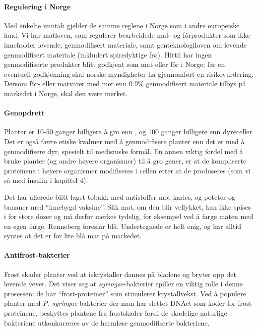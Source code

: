 \paragraph{Regulering i Norge} Med enkelte unntak gjelder de samme reglene i Norge som i andre europeiske land. Vi har matloven, som regulerer bearbeidede mat- og fôrprodukter som ikke inneholder levende, genmodifisert materiale, samt genteknologiloven om levende genmodifisert materiale (inkludert spiredyktige frø). Hittil har ingen genmodifiserte produkter blitt godkjent som mat eller fôr i Norge; før en eventuell godkjenning skal norske myndigheter ha gjennomført en risikovurdering. Dersom fôr- eller matvarer med mer enn 0.9\% genmodifisert materiale tilbys på markedet i Norge, skal den være merket.

\paragraph{Genopdrett} Planter er 10-50 ganger billigere å gro enn , og 100 ganger billigere enn dyreceller. Det er også færre etiske kvalmer med å genmodifisere planter enn det er med å genmodifisere dyr, spesielt til medisinske formål. En annen viktig fordel med å bruke planter (og andre høyere organismer) til å gro gener, er at de kompliserte proteinene i høyere organismer modifiseres i cellen etter at de produseres (som vi så med insulin i kapittel 4).

Det har allerede blitt laget tobakk med antistoffer mot karies, og poteter og bananer med ``innebygd vaksine''. Slik mat, om den blir vellykket, kan ikke spises i for store doser og må derfor merkes tydelig, for eksempel ved å farge maten med en egen farge. Renneberg foreslår blå. Undertegnede er helt enig, og har alltid syntes at det er for lite blå mat på markedet.

\paragraph{Antifrost-bakterier} Frost skader planter ved at iskrystaller dannes på bladene og bryter opp det levende vevet. Det viser seg at  \emph{syringae}-bakterier spiller en viktig rolle i denne prosessen: de har ``frost-proteiner'' som stimulerer krystallvekst. Ved å populere planter med \emph{P. syringae}-bakterier der man har slettet DNAet som koder for frost-proteinene, beskyttes plantene fra frostskader fordi de skadelige naturlige bakteriene utkonkurreres av de harmløse genmodifiserte bakteriene.

